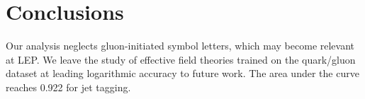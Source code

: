 \section{Conclusions}\label{sec:conclusions}

Our analysis neglects gluon-initiated symbol letters, which may become
relevant at LEP. We leave the study of effective field theories trained
on the quark/gluon dataset at leading logarithmic accuracy to future
work. The area under the curve reaches 0.922 for jet tagging.

